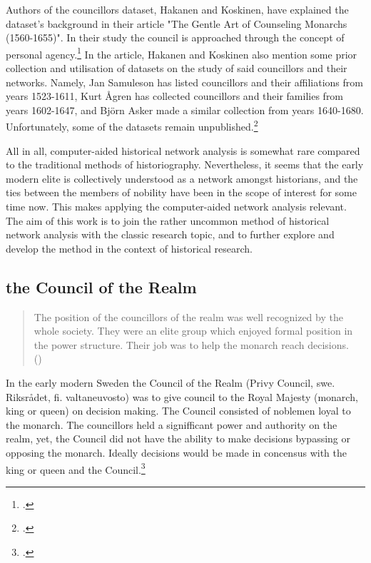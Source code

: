 Authors of the councillors dataset, Hakanen and Koskinen, have explained the dataset's background in their article "The Gentle Art of Counseling Monarchs (1560-1655)". In their study the council is approached through the concept of personal agency.\footcite{HakanenAKoskinen2017} In the article, Hakanen and Koskinen also mention some prior collection and utilisation of datasets on the study of said councillors and their networks. Namely, Jan Samuleson has listed councillors and their affiliations from years 1523-1611, Kurt Ågren has collected councillors and their families from years 1602-1647, and Björn Asker made a similar collection from years 1640-1680. Unfortunately, some of the datasets remain unpublished.\footcite[p. 48, 67 (cite 4).]{HakanenAKoskinen2017} 

All in all, computer-aided historical network analysis is somewhat rare compared to the traditional methods of historiography. Nevertheless, it seems that the early modern elite is collectively understood as a network amongst historians, and the ties between the members of nobility have been in the scope of interest for some time now. This makes applying the computer-aided network analysis relevant. The aim of this work is to join the rather uncommon method of historical network analysis with the classic research topic, and to further explore and develop the method in the context of historical research.

\subsection{the Council of the Realm}
\label{councilofrealm}
\begin{quote}
	The position of the councillors of the realm was well recognized by the whole society. They were an elite group which enjoyed formal position in the power structure. Their job was to help the monarch reach decisions.\\
	(\cite[p. 26.]{agencyAndStateBuilding})
\end{quote}

In the early modern Sweden the Council of the Realm (Privy Council, swe. Riksrådet, fi. valtaneuvosto) was to give council to the Royal Majesty (monarch, king or queen) on decision making. The Council consisted of noblemen loyal to the monarch. The councillors held a signifficant power and authority on the realm, yet, the Council did not have the ability to make decisions bypassing or opposing the monarch. Ideally decisions would be made in concensus with the king or queen and the Council.\footcites[pp. 13-14,]{hopesAndFearsIntro}[pp. 47-50.]{HakanenAKoskinen2017}

